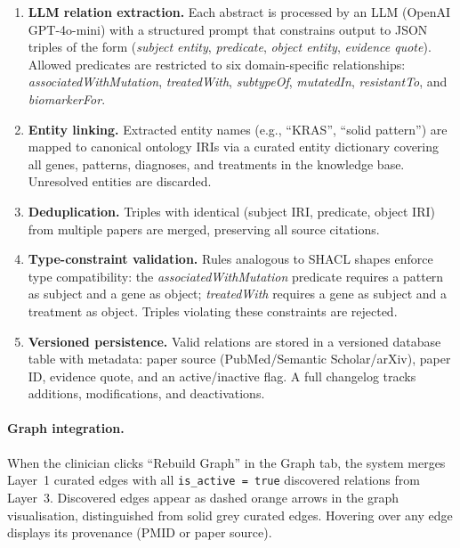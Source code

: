 \begin{enumerate}
    \item \textbf{LLM relation extraction.}
    Each abstract is processed by an LLM (OpenAI GPT-4o-mini) with a
    structured prompt that constrains output to JSON triples of the
    form (\emph{subject entity}, \emph{predicate}, \emph{object entity},
    \emph{evidence quote}).
    Allowed predicates are restricted to six domain-specific
    relationships: \emph{associatedWithMutation},
    \emph{treatedWith}, \emph{subtypeOf}, \emph{mutatedIn},
    \emph{resistantTo}, and \emph{biomarkerFor}.

    \item \textbf{Entity linking.}
    Extracted entity names (e.g., ``KRAS'', ``solid pattern'') are
    mapped to canonical ontology IRIs via a curated entity dictionary
    covering all genes, patterns, diagnoses, and treatments in the
    knowledge base.
    Unresolved entities are discarded.

    \item \textbf{Deduplication.}
    Triples with identical (subject IRI, predicate, object IRI)
    from multiple papers are merged, preserving all source citations.

    \item \textbf{Type-constraint validation.}
    Rules analogous to SHACL shapes enforce type compatibility:
    the \emph{associatedWithMutation} predicate requires a pattern
    as subject and a gene as object;
    \emph{treatedWith} requires a gene as subject and a treatment
    as object.
    Triples violating these constraints are rejected.

    \item \textbf{Versioned persistence.}
    Valid relations are stored in a versioned database table with
    metadata: paper source (PubMed/Semantic Scholar/arXiv), paper ID,
    evidence quote, and an active/inactive flag.
    A full changelog tracks additions, modifications, and
    deactivations.
\end{enumerate}

\paragraph{Graph integration.}
When the clinician clicks ``Rebuild Graph'' in the Graph tab, the
system merges Layer~1 curated edges with all \texttt{is\_active = true}
discovered relations from Layer~3.
Discovered edges appear as dashed orange arrows in the graph
visualisation, distinguished from solid grey curated edges.
Hovering over any edge displays its provenance (PMID or paper source).

